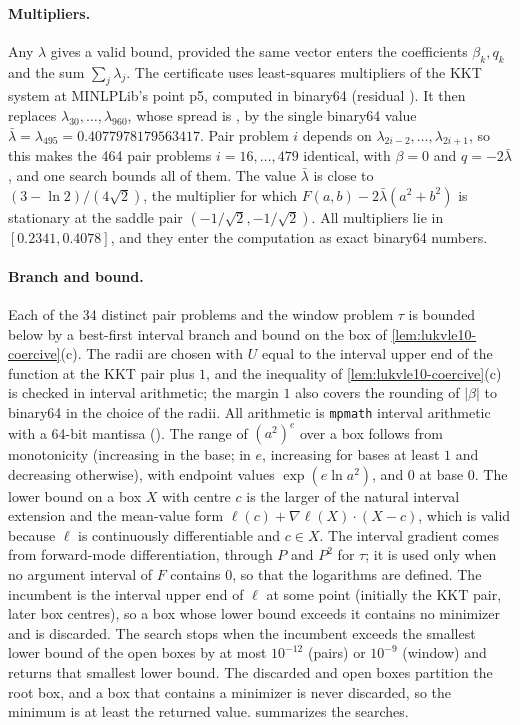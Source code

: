\paragraph{Multipliers.}
Any $\lambda$ gives a valid bound, provided the same vector enters the coefficients $\beta_k,q_k$ and the sum $\sum_j\lambda_j$.
The certificate uses least-squares multipliers of the KKT system at MINLPLib's point p5, computed in binary64 (residual ).
It then replaces $\lambda_{30},\dots,\lambda_{960}$, whose spread is , by the single binary64 value $\bar\lambda=\lambda_{495}=0.4077978179563417$.
Pair problem $i$ depends on $\lambda_{2i-2},\dots,\lambda_{2i+1}$, so this makes the 464 pair problems $i=16,\dots,479$ identical, with $\beta=0$ and $q=-2\bar\lambda$, and one search bounds all of them.
The value $\bar\lambda$ is close to $(3-\ln2)/(4\sqrt2)$, the multiplier for which $F(a,b)-2\bar\lambda(a^2+b^2)$ is stationary at the saddle pair $(-1/\sqrt2,-1/\sqrt2)$.
All multipliers lie in $[0.2341,0.4078]$, and they enter the computation as exact binary64 numbers.

\paragraph{Branch and bound.}
Each of the 34 distinct pair problems and the window problem $\tau$ is bounded below by a best-first interval branch and bound on the box of \cref{lem:lukvle10-coercive}(c).
The radii are chosen with $U$ equal to the interval upper end of the function at the KKT pair plus $1$, and the inequality of \cref{lem:lukvle10-coercive}(c) is checked in interval arithmetic; the margin $1$ also covers the rounding of $|\beta|$ to binary64 in the choice of the radii.
All arithmetic is \texttt{mpmath} interval arithmetic with a 64-bit mantissa ().
The range of $(a^2)^{e}$ over a box follows from monotonicity (increasing in the base; in $e$, increasing for bases at least $1$ and decreasing otherwise), with endpoint values $\exp(e\ln a^2)$, and $0$ at base $0$.
The lower bound on a box $X$ with centre $c$ is the larger of the natural interval extension and the mean-value form $\ell(c)+\nabla\ell(X)\cdot(X-c)$, which is valid because $\ell$ is continuously differentiable and $c\in X$.
The interval gradient comes from forward-mode differentiation, through $P$ and $P^2$ for $\tau$; it is used only when no argument interval of $F$ contains $0$, so that the logarithms are defined.
The incumbent is the interval upper end of $\ell$ at some point (initially the KKT pair, later box centres), so a box whose lower bound exceeds it contains no minimizer and is discarded.
The search stops when the incumbent exceeds the smallest lower bound of the open boxes by at most $10^{-12}$ (pairs) or $10^{-9}$ (window) and returns that smallest lower bound.
The discarded and open boxes partition the root box, and a box that contains a minimizer is never discarded, so the minimum is at least the returned value.
 summarizes the searches.

